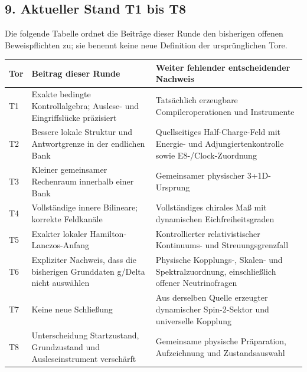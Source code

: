\subsection{9. Aktueller Stand T1 bis
T8}\label{aktueller-stand-t1-bis-t8}

Die folgende Tabelle ordnet die Beiträge dieser Runde den bisherigen
offenen Beweispflichten zu; sie benennt keine neue Definition der
ursprünglichen Tore.

{\def\LTcaptype{none} %
\begin{longtable}[]{@{}
  >{\raggedright\arraybackslash}p{}
  >{\raggedright\arraybackslash}p{}
  >{\raggedright\arraybackslash}p{}@{}}
\toprule\noalign{}
\begin{minipage}[b]{\linewidth}\raggedright
Tor
\end{minipage} & \begin{minipage}[b]{\linewidth}\raggedright
Beitrag dieser Runde
\end{minipage} & \begin{minipage}[b]{\linewidth}\raggedright
Weiter fehlender entscheidender Nachweis
\end{minipage} \\
\midrule\noalign{}
\endhead
\bottomrule\noalign{}
\endlastfoot
T1 & Exakte bedingte Kontrollalgebra; Auslese- und Eingriffslücke
präzisiert & Tatsächlich erzeugbare Compileroperationen und
Instrumente \\
T2 & Bessere lokale Struktur und Antwortgrenze in der endlichen Bank &
Quellseitiges Half-Charge-Feld mit Energie- und Adjungiertenkontrolle
sowie E8-/Clock-Zuordnung \\
T3 & Kleiner gemeinsamer Rechenraum innerhalb einer Bank & Gemeinsamer
physischer 3+1D-Ursprung \\
T4 & Vollständige innere Bilineare; korrekte Feldkanäle & Vollständiges
chirales Maß mit dynamischen Eichfreiheitsgraden \\
T5 & Exakter lokaler Hamilton-Lanczos-Anfang & Kontrollierter
relativistischer Kontinuums- und Streuungsgrenzfall \\
T6 & Expliziter Nachweis, dass die bisherigen Grunddaten g/Delta nicht
auswählen & Physische Kopplungs-, Skalen- und Spektralzuordnung,
einschließlich offener Neutrinofragen \\
T7 & Keine neue Schließung & Aus derselben Quelle erzeugter dynamischer
Spin-2-Sektor und universelle Kopplung \\
T8 & Unterscheidung Startzustand, Grundzustand und Ausleseinstrument
verschärft & Gemeinsame physische Präparation, Aufzeichnung und
Zustandsauswahl \\
\end{longtable}
}

